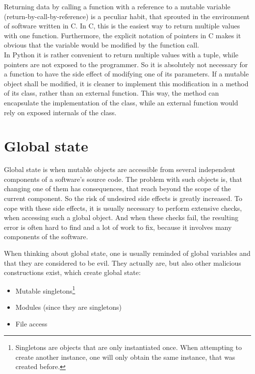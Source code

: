 		Returning data by calling a function with a reference to a mutable variable (return-by-call-by-reference) is a peculiar habit, that sprouted in the environment of software written in C.
		In C, this is the easiest way to return multiple values with one function.
		Furthermore, the explicit notation of pointers in C makes it obvious that the variable would be modified by the function call.\\
		In Python it is rather convenient to return multiple values with a tuple, while pointers are not exposed to the programmer.
		So it is absolutely not necessary for a function to have the side effect of modifying one of its parameters.
		If a mutable object shall be modified, it is cleaner to implement this modification in a method of its class, rather than an external function.
		This way, the method can encapsulate the implementation of the class, while an external function would rely on exposed internals of the class.


	\section{Global state}
		\label{GlobalState}
		Global state is when mutable objects are accessible from several independent components of a software's source code.
		The problem with such objects is, that changing one of them has consequences, that reach beyond the scope of the current component.
		So the risk of undesired side effects is greatly increased.
		To cope with these side effects, it is usually necessary to perform extensive checks, when accessing such a global object.
		And when these checks fail, the resulting error is often hard to find and a lot of work to fix, because it involves many components of the software.

		When thinking about global state, one is usually reminded of global variables and that they are considered to be evil.
		They actually are, but also other malicious constructions exist, which create global state:
		\begin{itemize}
			\item Mutable singletons\footnote{Singletons are objects that are only instantiated once. When attempting to create another instance, one will only obtain the same instance, that was created before.}
			\item Modules (since they are singletons)
			\item File access
		\end{itemize}

